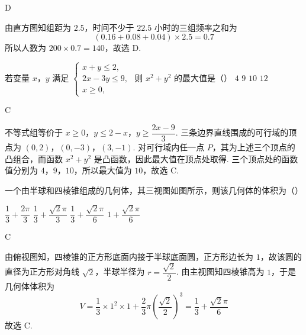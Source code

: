 \begin{answer}
D
\end{answer}

\begin{solution}
由直方图知组距为 \(2.5\)，时间不少于 \(22.5\) 小时的三组频率之和为
\[
(0.16+0.08+0.04)\times2.5=0.7
\]
所以人数为 \(200\times0.7=140\)，故选 D.
\end{solution}

\begin{problem}
若变量 \(x\)，\(y\) 满足
\(\begin{cases}
x+y\le 2,\\
2x-3y\le 9,\\
x\ge 0,
\end{cases}\)
则 \(x^2+y^2\) 的最大值是（\quad）
\choices
    {\(4\)}
    {\(9\)}
    {\(10\)}
    {\(12\)}
\end{problem}

\begin{answer}
C
\end{answer}

\begin{solution}
不等式组等价于 \(x\geq0\)，\(y\leq2-x\)，\(y\geq\dfrac{2x-9}{3}\). 三条边界直线围成的可行域的顶点为 \((0,2)\)，\((0,-3)\)，\((3,-1)\).
对可行域内任一点 \(P\)，其为上述三个顶点的凸组合，而函数 \(x^2+y^2\) 是凸函数，因此最大值在顶点处取得. 三个顶点处的函数值分别为 \(4\)，\(9\)，\(10\)，所以最大值为 \(10\)，故选 C.
\end{solution}

\begin{problem}
一个由半球和四棱锥组成的几何体，其三视图如图所示，则该几何体的体积为（\quad）


\choices
    {\(\dfrac13+\dfrac{2\pi}{3}\)}
    {\(\dfrac13+\dfrac{\sqrt2\pi}{3}\)}
    {\(\dfrac13+\dfrac{\sqrt2\pi}{6}\)}
    {\(1+\dfrac{\sqrt2\pi}{6}\)}
\end{problem}

\begin{answer}
C
\end{answer}

\begin{solution}
由俯视图知，四棱锥的正方形底面内接于半球底面圆，正方形边长为 \(1\)，故该圆的直径为正方形对角线 \(\sqrt2\)，半球半径为 \(r=\dfrac{\sqrt2}{2}\). 由主视图知四棱锥高为 \(1\)，于是几何体体积为
\[
V=\frac13\times1^2\times1+\frac23\pi\left(\frac{\sqrt2}{2}\right)^3
=\frac13+\frac{\sqrt2\pi}{6}
\]
故选 C.
\end{solution}

